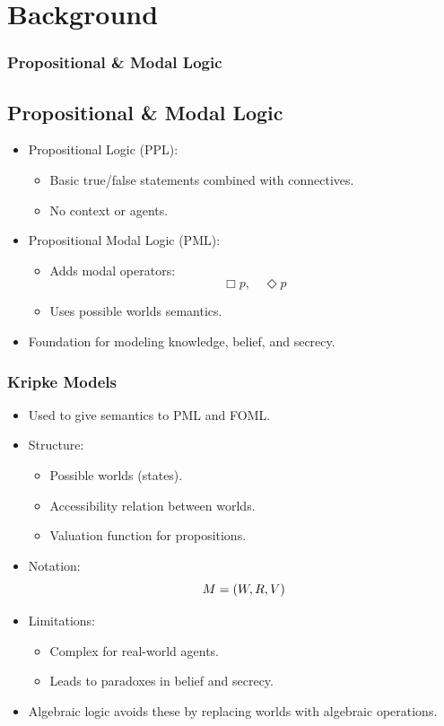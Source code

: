 \documentclass[aspectratio=169]{beamer}
\let\mathcal\relax
\begin{document}

\section{Background}
\begin{frame}
\frametitle{Propositional \& Modal Logic}
\subsection{Propositional \& Modal Logic}
\begin{itemize}
    \item Propositional Logic (PPL):
    \begin{itemize}
        \item Basic true/false statements combined with connectives.
        \item No context or agents.
    \end{itemize}
    \item Propositional Modal Logic (PML):
    \begin{itemize}
        \item Adds modal operators:
        \[
        \Box p, \quad \Diamond p
        \]
        \item Uses possible worlds semantics.
    \end{itemize}
    \item Foundation for modeling knowledge, belief, and secrecy.
\end{itemize}
\end{frame}

\begin{frame}
\frametitle{Kripke Models}
\begin{itemize}
    \item Used to give semantics to PML and FOML.
    \item Structure:
    \begin{itemize}
        \item Possible worlds (states).
        \item Accessibility relation between worlds.
        \item Valuation function for propositions.
    \end{itemize}
    \item Notation:
    \[
    \mathcal{M = (W, R, V)}
    \]
    \item Limitations:
    \begin{itemize}
        \item Complex for real-world agents.
        \item Leads to paradoxes in belief and secrecy.
    \end{itemize}
    \item Algebraic logic avoids these by replacing worlds with algebraic operations.
\end{itemize}
\end{frame}
\end{document}
